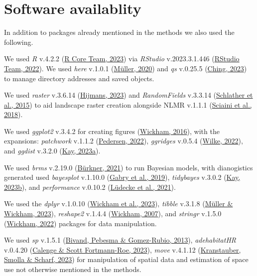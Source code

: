 \documentclass[10pt,a4paper]{article}
\begin{document}
\hypertarget{software-availablity}{%
\section{Software availablity}\label{software-availablity}}

In addition to packages already mentioned in the methods we also used the following.

We used \emph{R} v.4.2.2 (\protect\hyperlink{ref-base}{R Core Team, 2023}) via \emph{RStudio} v.2023.3.1.446 (\protect\hyperlink{ref-rstudio}{RStudio Team, 2022}).
We used \emph{here} v.1.0.1 (\protect\hyperlink{ref-here}{Müller, 2020}) and \emph{qs} v.0.25.5 (\protect\hyperlink{ref-qs}{Ching, 2023}) to manage directory addresses and saved objects.

We used \emph{raster} v.3.6.14 (\protect\hyperlink{ref-raster}{Hijmans, 2023}) and \emph{RandomFields} v.3.3.14 (\protect\hyperlink{ref-RandomFields}{Schlather et al., 2015}) to aid landscape raster creation alongside NLMR v.1.1.1 (\protect\hyperlink{ref-NLMR}{Sciaini et al., 2018}).

We used \emph{ggplot2} v.3.4.2 for creating figures (\protect\hyperlink{ref-ggplot2}{Wickham, 2016}), with the expansions: \emph{patchwork} v.1.1.2 (\protect\hyperlink{ref-patchwork}{Pedersen, 2022}), \emph{ggridges} v.0.5.4 (\protect\hyperlink{ref-ggridges}{Wilke, 2022}), and \emph{ggdist} v.3.2.0 (\protect\hyperlink{ref-ggdist}{Kay, 2023a}).

We used \emph{brms} v.2.19.0 (\protect\hyperlink{ref-brms}{Bürkner, 2021}) to run Bayesian models, with dianogistics generated used \emph{bayesplot} v.1.10.0 (\protect\hyperlink{ref-bayesplot}{Gabry et al., 2019}), \emph{tidybayes} v.3.0.2 (\protect\hyperlink{ref-tidybayes}{Kay, 2023b}), and \emph{performance} v.0.10.2 (\protect\hyperlink{ref-performance}{Lüdecke et al., 2021}).

We used the \emph{dplyr} v.1.0.10 (\protect\hyperlink{ref-dplyr}{Wickham et al., 2023}), \emph{tibble} v.3.1.8 (\protect\hyperlink{ref-tibble}{Müller \& Wickham, 2023}), \emph{reshape2} v.1.4.4 (\protect\hyperlink{ref-reshape2}{Wickham, 2007}), and \emph{stringr} v.1.5.0 (\protect\hyperlink{ref-stringr}{Wickham, 2022}) packages for data manipulation.

We used \emph{sp} v.1.5.1 (\protect\hyperlink{ref-sp}{Bivand, Pebesma \& Gomez-Rubio, 2013}), \emph{adehabitatHR} v.0.4.20 (\protect\hyperlink{ref-adehabitatHR}{Calenge \& Scott Fortmann-Roe, 2023}), \emph{move} v.4.1.12 (\protect\hyperlink{ref-move}{Kranstauber, Smolla \& Scharf, 2023}) for manipulation of spatial data and estimation of space use not otherwise mentioned in the methods.
\end{document}
